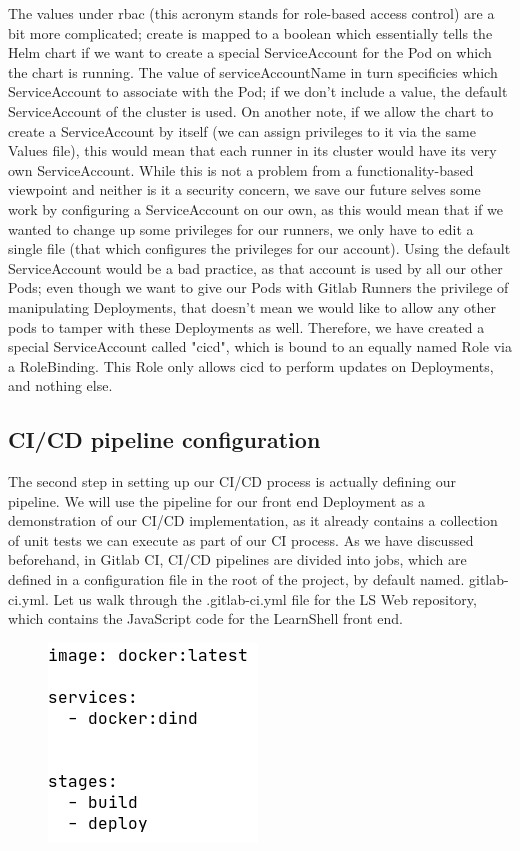 \documentclass[thesis=B,english]{FITthesis}[2019/12/23]
\begin{document}
The values under rbac (this acronym stands for role-based access control) are a bit more complicated; create is mapped to a boolean which essentially tells the Helm chart if we want to create a special ServiceAccount for the Pod on which the chart is running. The value of serviceAccountName in turn specificies which ServiceAccount to associate with the Pod; if we don't include a value, the default ServiceAccount of the cluster is used. On another note, if we allow the chart to create a ServiceAccount by itself (we can assign privileges to it via the same Values file), this would mean that each runner in its cluster would have its very own ServiceAccount. While this is not a problem from a functionality-based viewpoint and neither is it a security concern, we save our future selves some work by configuring a ServiceAccount on our own, as this would mean that if we wanted to change up some privileges for our runners, we only have to edit a single file (that which configures the privileges for our account). Using the default ServiceAccount would be a bad practice, as that account is used by all our other Pods; even though we want to give our Pods with Gitlab Runners the privilege of manipulating Deployments, that doesn't mean we would like to allow any other pods to tamper with these Deployments as well. Therefore, we have created a special ServiceAccount called "cicd", which is bound to an equally named Role via a RoleBinding. This Role only allows cicd to perform updates on Deployments, and nothing else. 



\subsection{CI/CD pipeline configuration}

The second step in setting up our CI/CD process is actually defining our pipeline. We will use the pipeline for our front end Deployment as a demonstration of our CI/CD implementation, as it already contains a collection of unit tests we can execute as part of our CI process. As we have discussed beforehand, in Gitlab CI, CI/CD pipelines are divided into jobs, which are defined in a configuration file in the root of the project, by default named. gitlab-ci.yml. Let us walk through the .gitlab-ci.yml file for the LS Web repository, which contains the JavaScript code for the LearnShell front end.

\begin{figure}[H]
\centering
\hspace*{-0.6cm}
\includegraphics[scale=0.5]{gitlab-ci-stages}
\end{figure}
\end{document}
